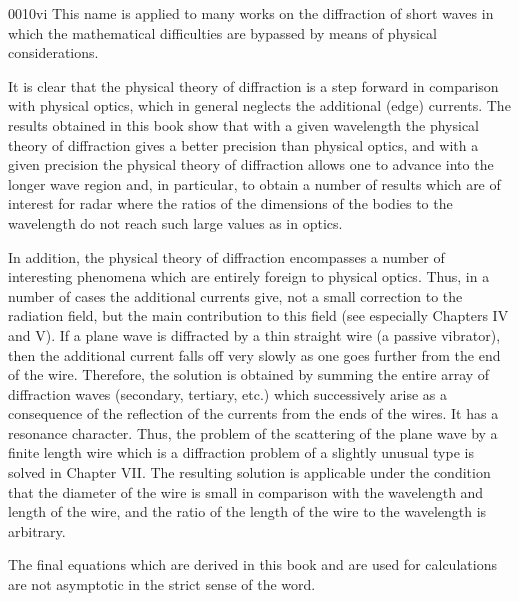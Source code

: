 \begin{scanpage}{0010}{vi}
This name is applied to many works on the diffraction of short waves in which the mathematical difficulties are bypassed by means of physical considerations.

It is clear that the physical theory of diffraction is a step forward in comparison with physical optics, which in general neglects the additional (edge) currents. The results obtained in this book show that with a given wavelength the physical theory of diffraction gives a better precision than physical optics, and with a given precision the physical theory of diffraction allows one to advance into the longer wave region and, in particular, to obtain a number of results which are of interest for radar where the ratios of the dimensions of the bodies to the wavelength do not reach such large values as in optics.

In addition, the physical theory of diffraction encompasses a number of interesting phenomena which are entirely foreign to physical optics. Thus, in a number of cases the additional currents give, not a small correction to the radiation field, but the main contribution to this field (see especially Chapters IV and V). If a plane wave is diffracted by a thin straight wire (a passive vibrator), then the additional current falls off very slowly as one goes further from the end of the wire. Therefore, the solution is obtained by summing the entire array of diffraction waves (secondary, tertiary, etc.) which successively arise as a consequence of the reflection of the currents from the ends of the wires. It has a resonance character. Thus, the problem of the scattering of the plane wave by a finite length wire which is a diffraction problem of a slightly unusual type is solved in Chapter VII. The resulting solution is applicable under the condition that the diameter of the wire is small in comparison with the wavelength and length of the wire, and the ratio of the length of the wire to the wavelength is arbitrary.

The final equations which are derived in this book and are used for calculations are not asymptotic in the strict sense of the word.
\end{scanpage}
